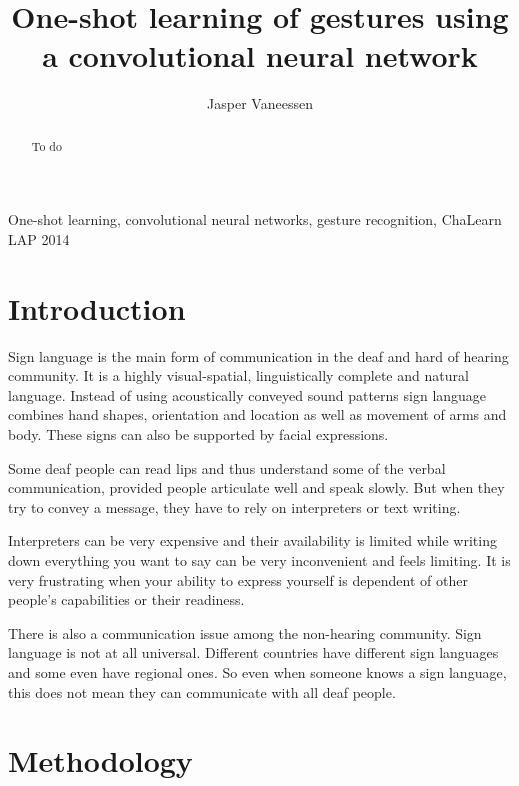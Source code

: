 \documentclass[twocolumn]{phdsymp} %
\begin{document}
\title{One-shot learning of gestures using a convolutional neural network} %

\author{Jasper Vaneessen}


\maketitle

\begin{abstract}
To do 
\end{abstract}

\begin{keywords}
One-shot learning, convolutional neural networks, gesture recognition, ChaLearn LAP 2014
\end{keywords}

\section{Introduction}
Sign language is the main form of communication in the deaf and hard of hearing community. It is a highly visual-spatial, linguistically complete and natural language. Instead of using acoustically conveyed sound patterns sign language combines hand shapes, orientation and location as well as movement of arms and body. These signs can also be supported by facial expressions.

Some deaf people can read lips and thus understand some of the verbal communication, provided people articulate well and speak slowly. But when they try to convey a message, they have to rely on interpreters or text writing.

Interpreters can be very expensive and their availability is limited while writing down everything you want to say can be very inconvenient and feels limiting. It is very frustrating when your ability to express yourself is dependent of other people’s capabilities or their readiness.

There is also  a communication issue among the non-hearing community. Sign language is not at all universal. Different countries have different sign languages and some even have regional ones. So even when someone knows a sign language, this does not mean they can communicate with all deaf people.


\section{Methodology}
\end{document}
